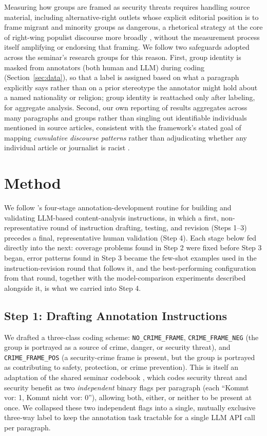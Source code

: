 \documentclass[a4paper,oneside,bibliography=totoc]{scrartcl}
\begin{document}
Measuring how groups are framed as security threats requires handling source material, including alternative-right outlets whose explicit editorial position is to frame migrant and minority groups as dangerous, a rhetorical strategy at the core of right-wing populist discourse more broadly \citep{wodak2015}, without the measurement process itself amplifying or endorsing that framing. We follow two safeguards adopted across the seminar's research groups for this reason. First, group identity is masked from annotators (both human and LLM) during coding (Section~\ref{sec:data}), so that a label is assigned based on what a paragraph explicitly says rather than on a prior stereotype the annotator might hold about a named nationality or religion; group identity is reattached only after labeling, for aggregate analysis. Second, our own reporting of results aggregates across many paragraphs and groups rather than singling out identifiable individuals mentioned in source articles, consistent with the framework's stated goal of mapping \emph{cumulative discourse patterns} rather than adjudicating whether any individual article or journalist is racist \citep{freudenthaler2025}.

\section{Method}
\label{sec:method}

We follow \citet{freudenthalerbacchuss}'s four-stage annotation-development routine for building and validating LLM-based content-analysis instructions, in which a first, non-representative round of instruction drafting, testing, and revision (Steps 1--3) precedes a final, representative human validation (Step 4). Each stage below fed directly into the next: coverage problems found in Step 2 were fixed before Step 3 began, error patterns found in Step 3 became the few-shot examples used in the instruction-revision round that follows it, and the best-performing configuration from that round, together with the model-comparison experiments described alongside it, is what we carried into Step 4.

\subsection*{Step 1: Drafting Annotation Instructions}

We drafted a three-class coding scheme: \texttt{NO\_CRIME\_FRAME}, \texttt{CRIME\_FRAME\_NEG} (the group is portrayed as a source of crime, danger, or security threat), and \texttt{CRIME\_FRAME\_POS} (a security-crime frame is present, but the group is portrayed as contributing to safety, protection, or crime prevention). This is itself an adaptation of the shared seminar codebook \citep{freudenthalercodebook}, which codes security threat and security benefit as two \emph{independent} binary flags per paragraph (each \enquote{Kommt vor: 1, Kommt nicht vor: 0}), allowing both, either, or neither to be present at once. We collapsed these two independent flags into a single, mutually exclusive three-way label to keep the annotation task tractable for a single LLM API call per paragraph.
\end{document}
